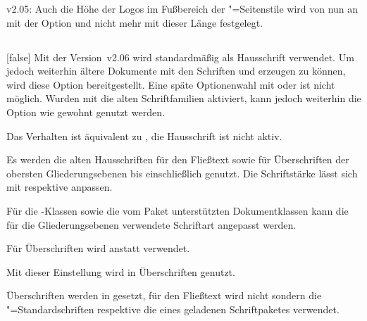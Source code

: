 \begin{Cessation}{v2.05:}{}%
\printobsoletelist%
%
Auch die Höhe der Logos im Fußbereich der "=Seitenstile 
wird von nun an mit der Option  und nicht mehr mit 
dieser Länge festgelegt.
\end{Cessation}


\subsection{}
\begin{Declaration}[v2.06]{}[false]
\printdeclarationlist%
%
Mit der Version~v2.06 wird standardmäßig \OpenSans als Hausschrift verwendet. 
Um jedoch weiterhin ältere Dokumente mit den Schriften \Univers und \DIN 
erzeugen zu können, wird diese Option bereitgestellt.
Eine späte Optionenwahl mit  oder  ist 
nicht möglich. Wurden mit  die alten Schriftfamilien 
aktiviert, kann jedoch weiterhin die Option  wie gewohnt 
genutzt werden.
%
\begin{values}{}
\item[false]
  Das Verhalten ist äquivalent zu , die Hausschrift ist 
  nicht aktiv.
\item[true]
  Es werden die alten Hausschriften \Univers für den Fließtext sowie \DIN für 
  Überschriften der obersten Gliederungsebenen bis einschließlich 
   genutzt. Die Schriftstärke lässt sich mit 
   respektive  anpassen.
\end{values}
%
Für die \TUDScript-Klassen sowie die vom Paket  
unterstützten Dokumentklassen kann die für die Gliederungsebenen verwendete 
Schriftart angepasst werden.
%
\begin{values}{}
\item[nodin]
  Für Überschriften wird \Univers anstatt \DIN verwendet.
\item[din]
  Mit dieser Einstellung wird \DIN in Überschriften genutzt. 
\item[onlydin]
  Überschriften werden in \DIN gesetzt, für den Fließtext wird nicht \Univers 
  sondern die "=Standardschriften respektive die eines geladenen 
  Schriftpaketes verwendet.
\end{values}
\end{Declaration}

